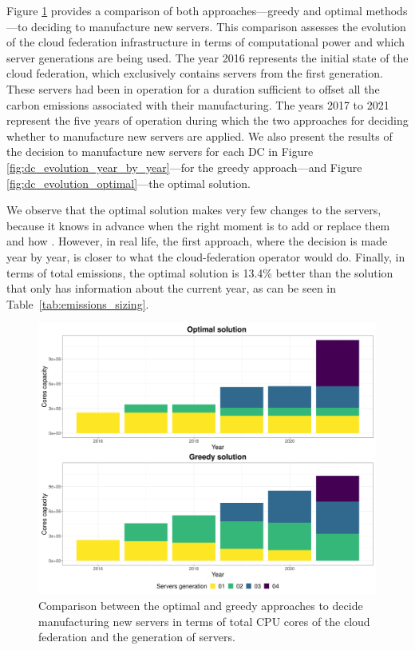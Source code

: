 Figure \ref{fig:dc_evolution_comparison} provides a comparison of both approaches---greedy and optimal methods---to deciding to manufacture new servers.   This comparison assesses the evolution of the cloud federation infrastructure in terms of computational power and which server generations are being used. The year 2016 represents the initial state of the cloud federation, which exclusively contains servers from the first generation. These servers had been in operation for a duration sufficient to offset all the carbon emissions associated with their manufacturing. The years 2017 to 2021 represent the five years of operation during which the two approaches for deciding whether to manufacture new servers are applied. We also present the results of the decision to manufacture new servers for each DC in Figure \ref{fig:dc_evolution_year_by_year}---for the greedy approach---and Figure \ref{fig:dc_evolution_optimal}---the optimal solution.

We observe that the optimal solution makes very few changes to the servers, because it knows in advance when the right moment is to add or replace them and how . However, in real life, the first approach, where the decision is made year by year, is closer to what the cloud-federation operator would do. Finally, in terms of total  emissions, the optimal solution is 13.4\% better than the solution that only has information about the current year, as can be seen in Table~\ref{tab:emissions_sizing}.

\begin{figure}[ht]
\centering 
  \includegraphics[width=\linewidth]{images/cloud_federation_evolution_lifetime.png}
  \caption{Comparison between the optimal and greedy approaches to decide manufacturing new servers in terms of total CPU cores of the cloud federation and the generation of servers.}
  \label{fig:dc_evolution_comparison}
\end{figure}


